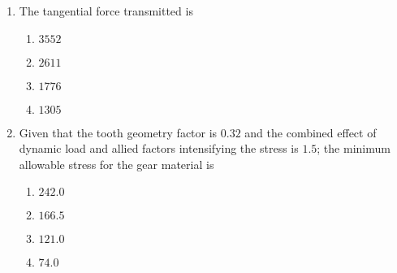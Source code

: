 \documentclass[journal,12pt,twocolumn]{IEEEtran}
\theoremstyle{remark}
\begin{document}
\begin{enumerate}[start=49]
    \item  The tangential force transmitted  is
    \begin{enumerate}
        \item $3552$
        \item $2611$
        \item $1776$
        \item $1305$
    \end{enumerate}

    \item  Given that the tooth geometry factor is $0.32$ and the combined effect of dynamic load and allied factors intensifying the stress is $1.5$; the minimum allowable stress  for the gear material is
    \begin{enumerate}
        \item $242.0$
        \item $166.5$
        \item $121.0$
        \item $74.0$
    \end{enumerate}
\end{enumerate}





    
\end{document}
